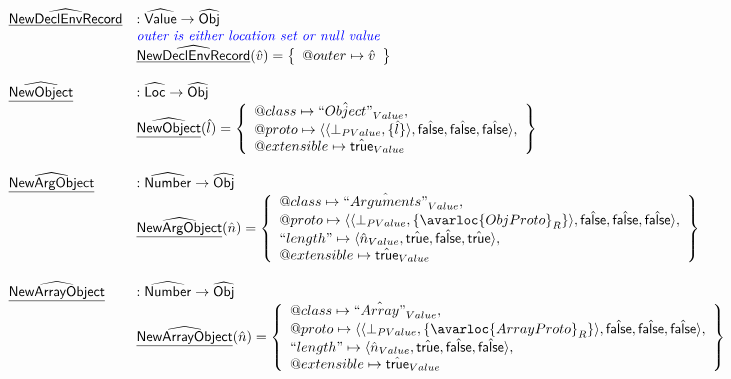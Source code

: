 \[\begin{array}{ll}
\\

\ahf{NewDeclEnvRecord} & : \abs{Value} \rightarrow \aObj \\
& \comment{\inblue outer is either location set or null value} \\
& \ahf{NewDeclEnvRecord}(\hat{v}) = \set{
    \varprop{outer} \mapsto \hat{v}
}\\\\

\ahf{NewObject} & : \aLoc \rightarrow \aObj \\
& \ahf{NewObject}(\hat{l}) = \set{\varprop{class}\mapsto \hat{``Object"}_{Value},\\
  \varprop{proto}\mapsto
   \langle \langle\bot_{PValue},\{\hat{l}\}\rangle,\afalse,\afalse,\afalse \rangle,\\
  \varprop{extensible}\mapsto \atrue_{Value}
  }\\
\\

\ahf{NewArgObject} & : \abs{Number} \rightarrow \aObj \\
& \ahf{NewArgObject}(\hat{n}) = \set{
    \varprop{class}\mapsto \hat{``Arguments"}_{Value},\\
    \varprop{proto}\mapsto 
    \langle\langle\bot_{PValue},\{\avarloc{ObjProto}_R\}\rangle,\afalse,\afalse,\afalse\rangle,\\
   ``length"\mapsto
   \langle\hat{n}_{Value},\atrue,\afalse,\atrue\rangle,\\
  \varprop{extensible}\mapsto \atrue_{Value}
}\\\\
    
\ahf{NewArrayObject} & : \abs{Number} \rightarrow \aObj \\
& \ahf{NewArrayObject}(\hat{n}) = \set{
    \varprop{class}\mapsto \hat{``Array"}_{Value},\\
    \varprop{proto}\mapsto 
    \langle\langle\bot_{PValue},\{\avarloc{ArrayProto}_R\}\rangle,\afalse,\afalse,\afalse\rangle,\\
   ``length"\mapsto
   \langle\hat{n}_{Value},\atrue,\afalse,\afalse\rangle,\\
  \varprop{extensible}\mapsto \atrue_{Value}
}\\\\


\end{array}\]
